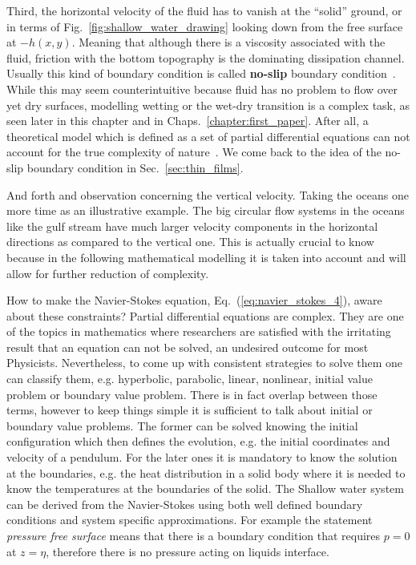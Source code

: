Third, the horizontal velocity of the fluid has to vanish at the ``solid'' ground, or in terms of Fig.~\ref{fig:shallow_water_drawing} looking down from the free surface at $-h(x,y)$.
Meaning that although there is a viscosity associated with the fluid, friction with the bottom topography is the dominating dissipation channel.
Usually this kind of boundary condition is called \textbf{no-slip} boundary condition~\cite{richardson_1973, doi:10.1021/la0116342, Salmon:1999:0022-2402:503}.
While this may seem counterintuitive because fluid has no problem to flow over yet dry surfaces, modelling wetting or the wet-dry transition is a complex task, as seen later in this chapter and in Chaps.~\ref{chapter:first_paper}.
After all, a theoretical model which is defined as a set of partial differential equations can not account for the true complexity of nature~\cite{scriven_1988}.
We come back to the idea of the no-slip boundary condition in Sec.~\ref{sec:thin_films}.

And forth and observation concerning the vertical velocity.
Taking the oceans one more time as an illustrative example.
The big circular flow systems in the oceans like the gulf stream have much larger velocity components in the horizontal directions as compared to the vertical one.  
This is actually crucial to know because in the following mathematical modelling it is taken into account and will allow for further reduction of complexity.

How to make the Navier-Stokes equation, Eq.~(\ref{eq:navier_stokes_4}), aware about these constraints?
Partial differential equations are complex. 
They are one of the topics in mathematics where researchers are satisfied with the irritating result that an equation can not be solved, an undesired outcome for most Physicists.
Nevertheless, to come up with consistent strategies to solve them one can classify them, e.g. hyperbolic, parabolic, linear, nonlinear, initial value problem or boundary value problem.
There is in fact overlap between those terms, however to keep things simple it is sufficient to talk about initial or boundary value problems.
The former can be solved knowing the initial configuration which then defines the evolution, e.g. the initial coordinates and velocity of a pendulum. 
For the later ones it is mandatory to know the solution at the boundaries, e.g. the heat distribution in a solid body where it is needed to know the temperatures at the boundaries of the solid.
The Shallow water system can be derived from the Navier-Stokes using both well defined boundary conditions and system specific approximations.
For example the statement \textit{pressure free surface} means that there is a boundary condition that requires $p = 0$ at $z = \eta$, therefore there is no pressure acting on liquids interface.


